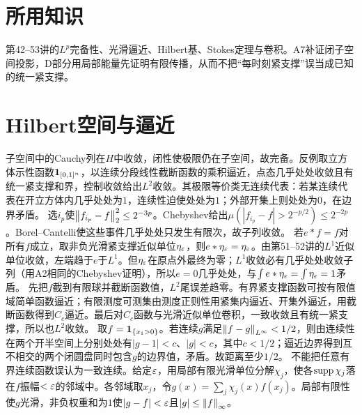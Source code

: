 \documentclass[UTF8,fontset=fandol,11pt]{ctexart}
\begin{document}
\section*{所用知识}
第42--53讲的$L^p$完备性、光滑逼近、Hilbert基、Stokes定理与卷积。A7补证闭子空间投影，D部分用局部能量先证明有限传播，从而不把“每时刻紧支撑”误当成已知的统一紧支撑。
\section{Hilbert空间与逼近}
子空间中的Cauchy列在$H$中收敛，闭性使极限仍在子空间，故完备。反例取立方体示性函数$\mathbf1_{[0,1]^n}$，以连续分段线性截断函数的乘积逼近，点态几乎处处收敛且有统一紧支撑和界，控制收敛给出$L^2$收敛。其极限等价类无连续代表：若某连续代表在开立方体内几乎处处为$1$，连续性迫使处处为$1$；外部开集上则处处为$0$，在边界矛盾。
选$i_p$使$\left\lVert f_{i_p}-f\right\rVert_2^2\le2^{-3p}$。Chebyshev给出$\mu(|f_{i_p}-f|>2^{-p/2})\le2^{-2p}$。Borel--Cantelli使这些事件几乎处处只发生有限次，故子列收敛。
若$e*f=f$对所有$f$成立，取非负光滑紧支撑近似单位$\eta_\varepsilon$，则$e*\eta_\varepsilon=\eta_\varepsilon$。由第51--52讲的$L^1$近似单位收敛，左端趋于$e$于$L^1$。但$\eta_\varepsilon$在原点外最终为零；$L^1$收敛必有几乎处处收敛子列（用A2相同的Chebyshev证明），所以$e=0$几乎处处，与$\int e*\eta_\varepsilon=\int\eta_\varepsilon=1$矛盾。
先把$f$截到有限球并截断函数值，$L^2$尾误差趋零。有界紧支撑函数可按有限值域简单函数逼近；有限测度可测集由测度正则性用紧集内逼近、开集外逼近，用截断函数得到$C_c$逼近。最后对$C_c$函数与光滑近似单位卷积，一致收敛且有统一紧支撑，所以也$L^2$收敛。
取$f=\mathbf1_{\{x_1>0\}}$。若连续$g$满足$\left\lVert f-g\right\rVert_{L^\infty}<1/2$，则由连续性在两个开半空间上分别处处有$|g-1|<c$、$|g|<c$，其中$c<1/2$；逼近边界得到互不相交的两个闭圆盘同时包含$g$的边界值，矛盾。故距离至少$1/2$。
不能把任意有界连续函数误认为一致连续。给定$\varepsilon$，用局部有限光滑单位分解$\chi_j$，使各$\operatorname{supp}\chi_j$落在$f$振幅$<\varepsilon$的邻域中。各邻域取$x_j$，令$g(x)=\sum_j\chi_j(x)f(x_j)$。局部有限性使$g$光滑，非负权重和为$1$使$|g-f|<\varepsilon$且$|g|\le\left\lVert f\right\rVert_\infty$。
\end{document}
